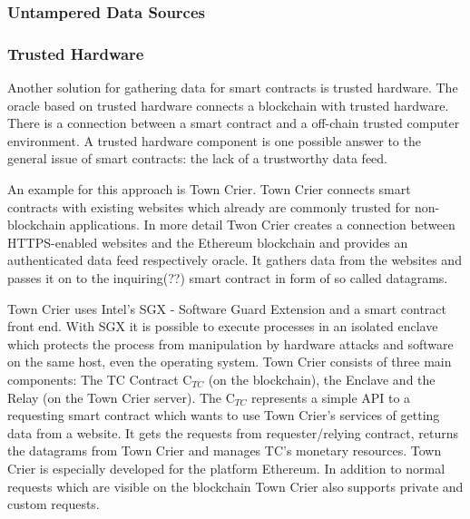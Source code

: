 \documentclass[conference]{IEEEtran}
\begin{document}
\subsubsection{Untampered Data Sources}
\subsubsection{Trusted Hardware}
Another solution for gathering data for smart contracts is trusted hardware. The oracle based on trusted hardware connects a blockchain with trusted hardware. There is a connection between a smart contract and a off-chain trusted computer environment. A trusted hardware component is one possible answer to the general issue of smart contracts: the lack of a trustworthy data feed.\par 
An example for this approach is Town Crier. Town Crier connects smart contracts with existing websites which already are commonly trusted for non-blockchain applications. In more detail Twon Crier creates a connection between HTTPS-enabled websites and the Ethereum blockchain and provides an authenticated data feed respectively oracle. It gathers data from the websites and passes it on to the inquiring(??) smart contract in form of so called datagrams.\par 
Town Crier uses Intel’s SGX - Software Guard Extension and a smart contract front end. With SGX it is possible to execute processes in an isolated enclave which protects the process from manipulation by hardware attacks and software on the same host, even the operating system. Town Crier consists of three main components: The TC Contract C$_{TC}$ (on the blockchain), the Enclave and the Relay (on the Town Crier server). The C$_{TC}$ represents a simple API to a requesting smart contract which wants to use Town Crier's services of getting data from a website. It gets the requests from requester/relying contract, returns the datagrams from Town Crier and manages TC's monetary resources.
Town Crier is especially developed for the platform Ethereum.
In addition to normal requests which are visible on the blockchain Town Crier also supports private and custom requests.
%
%
\end{document}
